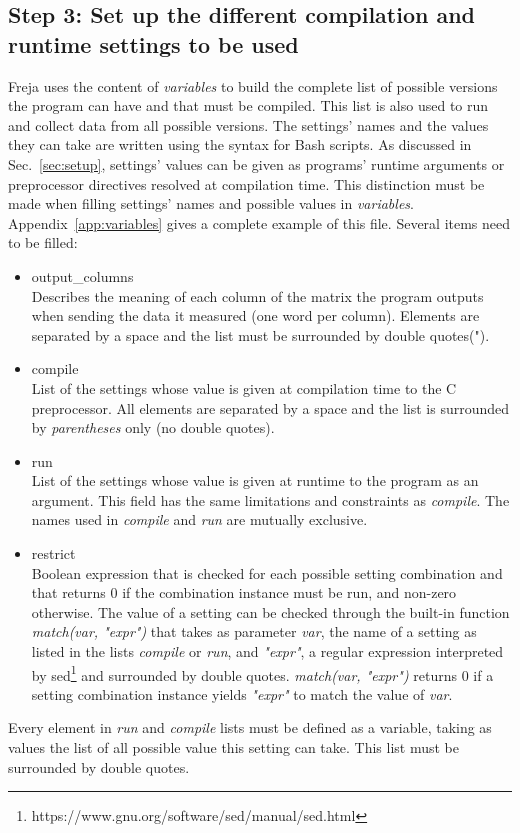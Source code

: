 \subsection{Step 3: Set up the different compilation and runtime settings to be used}
\label{sec:plan}
Freja uses the content of \emph{variables} to build the complete list of possible versions the program can have and that must be compiled. This list is also used to run and collect data from all possible versions. The settings' names and the values they can take are written using the syntax for Bash scripts. As discussed in Sec.~\ref{sec:setup}, settings' values can be given as programs' runtime arguments or preprocessor directives resolved at compilation time. This distinction must be made when filling settings' names and possible values in \emph{variables}. Appendix~\ref{app:variables} gives a complete example of this file. Several items need to be filled:
\begin{itemize}
\item output\_columns\\
Describes the meaning of each column of the matrix the program outputs when sending the data it measured (one word per column). Elements are separated by a space and the list must be surrounded by double quotes(").
\item compile\\
List of the settings whose value is given at compilation time to the {C} preprocessor. All elements are separated by a space and the list is surrounded by \emph{parentheses} only (no double quotes).
\item run\\
List of the settings whose value is given at runtime to the program as an argument. This field has the same limitations and constraints as \emph{compile}. The names used in \emph{compile} and \emph{run} are mutually exclusive.
\item restrict\\
Boolean expression that is checked for each possible setting combination and that returns 0 if the combination instance must be run, and non-zero otherwise. The value of a setting can be checked through the built-in function \emph{match(var, "expr")} that takes as parameter \emph{var}, the name of a setting as listed in the lists \emph{compile} or \emph{run}, and \emph{"expr"}, a regular expression interpreted by sed\footnote{https://www.gnu.org/software/sed/manual/sed.html} and surrounded by double quotes. \emph{match(var, "expr")} returns 0 if a setting combination instance yields \emph{"expr"} to match the value of \emph{var}.
\end{itemize}
Every element in \emph{run} and \emph{compile} lists must be defined as a variable, taking as values the list of all possible value this setting can take. This list must be surrounded by double quotes.

